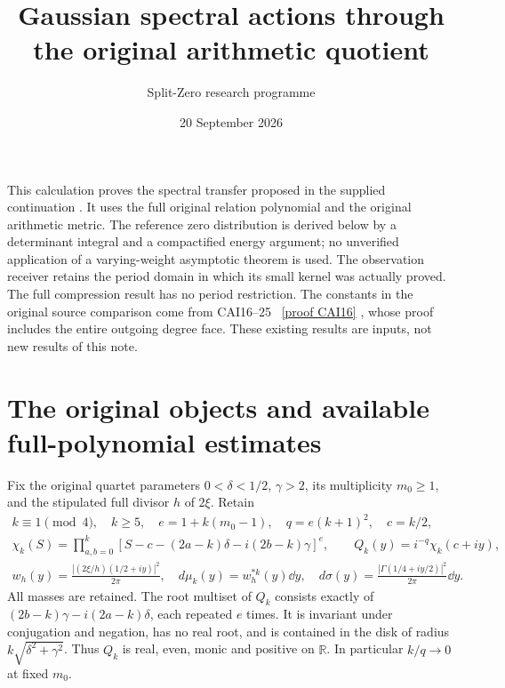 \documentclass[11pt]{article}
\title{Gaussian spectral actions through the original arithmetic quotient}
\author{Split-Zero research programme}\date{20 September 2026}
\newcommand{\R}{\mathbb R}\newcommand{\C}{\mathbb C}
\begin{document}
\maketitle

This calculation proves the spectral transfer proposed in the supplied
continuation \cite{incoming}. It uses the full original relation polynomial
and the original arithmetic metric. The reference zero distribution is
derived below by a determinant integral and a compactified energy argument;
no unverified application of a varying-weight asymptotic theorem is used.
The observation receiver retains the period domain in which its small
kernel was actually proved. The full compression result has no period
restriction. The constants in the original source comparison come from
CAI16--25 \cite{cumulative}%
~\href{https://github.com/KokunoYumeto/zeta-function-research-reader/blob/5992ad50c0f2a06921f1fcaded7b4e38097c0739/workbenches/splitzero-tandem/continuations/20260920-original-kernel-mixed-determinants/cumulative/09_UPDATED_JOINT_NOTE.tex\#L63199}{[proof CAI16]}%
{}, whose proof includes the entire outgoing degree
face. These existing results are inputs, not new results of this note.

\section{The original objects and available full-polynomial estimates}
Fix the original quartet parameters $0<\delta<1/2$, $\gamma>2$, its
multiplicity $m_0\ge1$, and the stipulated full divisor $h$ of $2\xi$.
Retain
\begin{equation}\tag{NG1}
 \begin{gathered}
 k\equiv1\pmod4,\quad k\ge5,\quad e=1+k(m_0-1),\quad q=e(k+1)^2,\quad c=k/2,\\
 \chi_k(S)=\prod_{a,b=0}^k
 [S-c-(2a-k)\delta-i(2b-k)\gamma]^e,\qquad
 Q_k(y)=i^{-q}\chi_k(c+iy),\\
 w_h(y)=\frac{|(2\xi/h)(1/2+iy)|^2}{2\pi},\quad
 d\mu_k(y)=w_h^{*k}(y)\dd y,\quad
 d\sigma(y)=\frac{|\Gamma(1/4+iy/2)|^2}{2\pi}\dd y.
 \end{gathered}
\end{equation}
All masses are retained. The root multiset of $Q_k$ consists exactly of
$(2b-k)\gamma-i(2a-k)\delta$, each repeated $e$ times. It is invariant
under conjugation and negation, has no real root, and is contained in the
disk of radius $k\sqrt{\delta^2+\gamma^2}$. Thus $Q_k$ is real, even,
monic and positive on $\R$. In particular $k/q\to0$ at fixed $m_0$.
\end{document}
